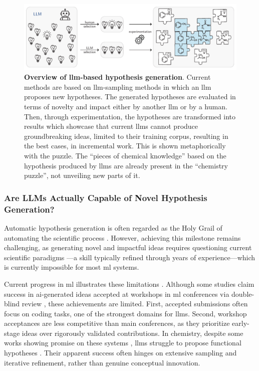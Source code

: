 \begin{figure}[!ht]
    \centering
        \includegraphics[width=1\textwidth]{figures/rescaled_figures/chemrev_figure13.pdf}
    \caption{\textbf{Overview of \gls{llm}-based hypothesis generation}. 
    Current methods are based on \gls{llm}-sampling methods in which an \gls{llm} proposes new hypotheses. 
    The generated hypotheses are evaluated in terms of novelty and impact either by another \gls{llm} or by a human. Then, through experimentation, the hypotheses are transformed into results which showcase that current \glspl{llm} cannot produce groundbreaking ideas, limited to their training corpus, resulting in the best cases, in incremental work. This is shown metaphorically with the puzzle. The \enquote{pieces of chemical knowledge} based on the hypothesis produced by \glspl{llm} are already present in the \enquote{chemistry puzzle}, not unveiling new parts of it.}
    \label{fig:hypothesis-generation}
\end{figure}

\subsubsection{Are LLMs Actually Capable of Novel Hypothesis Generation?}

Automatic hypothesis generation is often regarded as the Holy Grail of automating the scientific process \autocite{coley2020autonomous}. However, achieving this milestone remains challenging, as generating novel and impactful ideas requires questioning current scientific paradigms \autocite{Kuhn1962Structure}---a skill typically refined through years of experience---which is currently impossible for most \gls{ml} systems.

Current progress in \gls{ml} illustrates these limitations \autocite{kon2025exp0bench0, gu2024interesting}. Although some studies claim success in \gls{ai}-generated ideas accepted at workshops in \gls{ml} conferences via double-blind review \autocite{zhou2025tempest0}, these achievements are limited. 
First, accepted submissions often focus on coding tasks, one of the strongest domains for \glspl{llm}. Second, workshop acceptances are less competitive than main conferences, as they prioritize early-stage ideas over rigorously validated contributions. 
In chemistry, despite some works showing promise on these systems \autocite{yang2025moose0chem20}, \glspl{llm} struggle to propose functional hypotheses \autocite{si2025ideation1execution}.
Their apparent success often hinges on extensive sampling and iterative refinement, rather than genuine conceptual innovation.

